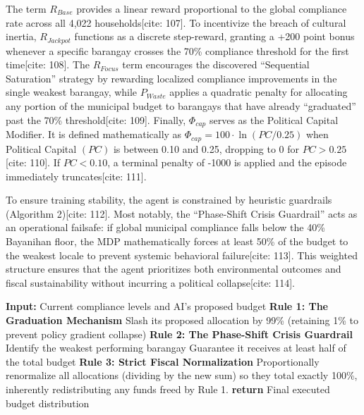 \documentclass[conference]{IEEEtran}
\begin{document}
The term $R_{Base}$ provides a linear reward proportional to the global compliance rate across all 4,022 households[cite: 107]. To incentivize the breach of cultural inertia, $R_{Jackpot}$ functions as a discrete step-reward, granting a +200 point bonus whenever a specific barangay crosses the 70\% compliance threshold for the first time[cite: 108]. The $R_{Focus}$ term encourages the discovered ``Sequential Saturation'' strategy by rewarding localized compliance improvements in the single weakest barangay, while $P_{Waste}$ applies a quadratic penalty for allocating any portion of the municipal budget to barangays that have already ``graduated'' past the 70\% threshold[cite: 109]. Finally, $\Phi_{cap}$ serves as the Political Capital Modifier. It is defined mathematically as $\Phi_{cap}=100\cdot \ln(PC/0.25)$ when Political Capital $(PC)$ is between 0.10 and 0.25, dropping to 0 for $PC>0.25$[cite: 110]. If $PC<0.10$, a terminal penalty of -1000 is applied and the episode immediately truncates[cite: 111].

To ensure training stability, the agent is constrained by heuristic guardrails (Algorithm 2)[cite: 112]. Most notably, the ``Phase-Shift Crisis Guardrail'' acts as an operational failsafe: if global municipal compliance falls below the 40\% Bayanihan floor, the MDP mathematically forces at least 50\% of the budget to the weakest locale to prevent systemic behavioral failure[cite: 113]. This weighted structure ensures that the agent prioritizes both environmental outcomes and fiscal sustainability without incurring a political collapse[cite: 114].

\begin{algorithm}
\caption{The Mayor Agent's Triage \& Safety Heuristics [cite: 115]}
\begin{algorithmic}[1]
\STATE \textbf{Input:} Current compliance levels and AI's proposed budget
\STATE \textbf{Rule 1: The Graduation Mechanism}
\STATE Slash its proposed allocation by 99\% (retaining 1\% to prevent policy gradient collapse)
\ENDIF
\ENDFOR
\STATE \textbf{Rule 2: The Phase-Shift Crisis Guardrail}
\STATE Identify the weakest performing barangay
\STATE Guarantee it receives at least half of the total budget
\ENDIF
\STATE \textbf{Rule 3: Strict Fiscal Normalization}
\STATE Proportionally renormalize all allocations (dividing by the new sum) so they total exactly 100\%, inherently redistributing any funds freed by Rule 1.
\STATE \textbf{return} Final executed budget distribution
\end{algorithmic}
\end{algorithm}
\end{document}
